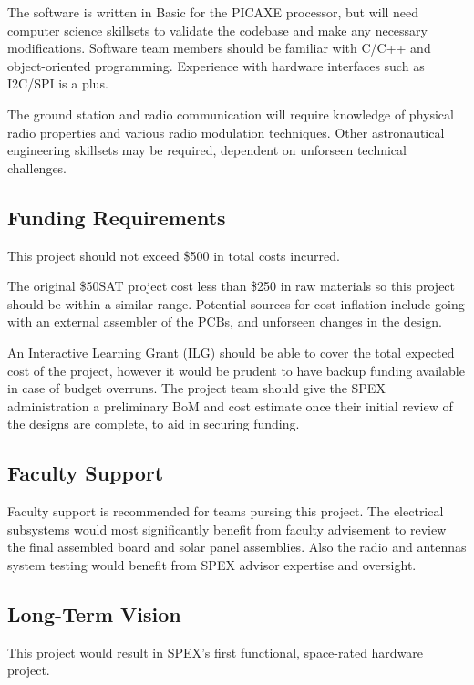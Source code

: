 \documentclass[conference]{IEEEtran} %
\begin{document}
The software is written in Basic for the PICAXE processor, but will need computer science skillsets to validate the codebase and make any necessary modifications.
Software team members should be familiar with C/C++ and object-oriented programming.
Experience with hardware interfaces such as I2C/SPI is a plus.

The ground station and radio communication will require knowledge of physical radio properties and various radio modulation techniques.
Other astronautical engineering skillsets may be required, dependent on unforseen technical challenges.


\subsection{Funding Requirements}
This project should not exceed \$500 in total costs incurred.

The original \$50SAT project cost less than \$250 in raw materials so this project should be within a similar range.
Potential sources for cost inflation include going with an external assembler of the PCBs, and unforseen changes in the design.

An Interactive Learning Grant (ILG) should be able to cover the total expected cost of the project, however it would be prudent to have backup funding available in case of budget overruns.
The project team should give the SPEX administration a preliminary BoM and cost estimate once their initial review of the designs are complete, to aid in securing funding.

\subsection{Faculty Support}
Faculty support is recommended for teams pursing this project.
The electrical subsystems would most significantly benefit from faculty advisement to review the final assembled board and solar panel assemblies.
Also the radio and antennas system testing would benefit from SPEX advisor expertise and oversight.

\subsection{Long-Term Vision}
\label{sec:vision}
This project would result in SPEX's first functional, space-rated hardware project.
\end{document}
